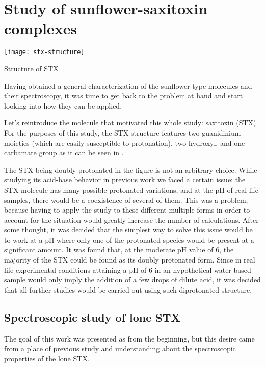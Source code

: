 \chapter{Study of sunflower-saxitoxin complexes}

\begin{marginfigure}
    \texttt{[image: stx-structure]}
    \caption[Structure of STX]{Structure of STX}
\end{marginfigure}

Having obtained a general characterization of the sunflower-type molecules and their spectroscopy, it was time to get back to the problem at hand and start looking into how they can be applied.

Let's reintroduce the molecule that motivated this whole study: saxitoxin (STX).
For the purposes of this study, the STX structure features two guanidinium moieties (which are easily susceptible to protonation), two hydroxyl, and one carbamate group as it can be seen in .

The STX being doubly protonated in the figure is not an arbitrary choice.
While studying its acid-base behavior in previous work we faced a certain issue: the STX molecule has many possible protonated variations, and at the pH of real life samples, there would be a coexistence of several of them.
This was a problem, because having to apply the study to these different multiple forms in order to account for the situation would greatly increase the number of calculations.
After some thought, it was decided that the simplest way to solve this issue would be to work at a pH where only one of the protonated species would be present at a significant amount.
It was found that, at the moderate pH value of 6, the majority of the STX could be found as its doubly protonated form.
Since in real life experimental conditions attaining a pH of 6 in an hypothetical water-based sample would only imply the addition of a few drops of dilute acid, it was decided that all further studies would be carried out using such diprotonated structure.

\section{Spectroscopic study of lone STX}
The goal of this work was presented as  from the beginning, but this desire came from a place of previous study and understanding about the spectroscopic properties of the lone STX.

